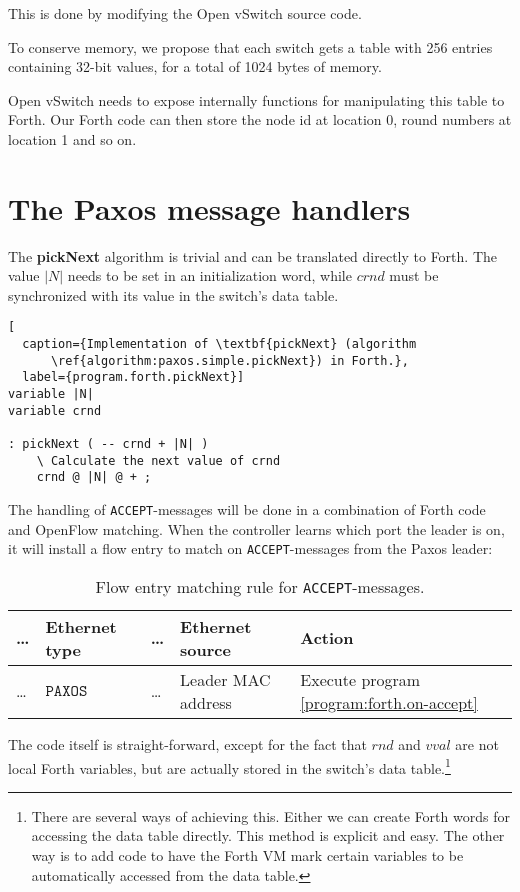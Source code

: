 This is done by modifying the Open vSwitch source code.

To conserve memory, we propose that each switch gets a table with 256
entries containing 32-bit values, for a total of 1024 bytes of memory.

Open vSwitch needs to expose internally functions for manipulating this table
to Forth.  Our Forth code can then store the node id at location 0, round
numbers at location 1 and so on.

\section{The Paxos message handlers}

The \textbf{pickNext} algorithm is trivial and can be translated directly to
Forth.  The value $|N|$ needs to be set in an initialization word,
while $crnd$ must be synchronized with its value in the switch's data table.

\begin{lstlisting}[
  caption={Implementation of \textbf{pickNext} (algorithm
      \ref{algorithm:paxos.simple.pickNext}) in Forth.},
  label={program.forth.pickNext}]
variable |N|
variable crnd

: pickNext ( -- crnd + |N| )
    \ Calculate the next value of crnd
    crnd @ |N| @ + ;
\end{lstlisting}

The handling of \texttt{ACCEPT}-messages will be done in a combination of
Forth code and OpenFlow matching.  When the controller learns which port the
leader is on, it will install a flow entry to match on
\texttt{ACCEPT}-messages from the Paxos leader:

\begin{table}[H]
  \centering
  \begin{tabular}{l|l|l|l|l|}
    \hline
      \dots &
      \textbf{Ethernet type} &
      \dots &
      \textbf{Ethernet source} &
      \textbf{Action}
      \\
    \hline
      \dots &
      $\texttt{PAXOS ACCEPT}$
      & \dots
      & Leader MAC address
      & Execute program \ref{program:forth.on-accept}
      \\
    \hline
  \end{tabular}
  \caption{Flow entry matching rule for \texttt{ACCEPT}-messages.}
  \label{table:matching.simple.accept}
\end{table}

The code itself is straight-forward, except for the fact that $rnd$ and
$vval$ are not local Forth variables, but are actually stored in the
switch's data table.\footnote{There are several ways of achieving this.
Either we can create Forth words for accessing the data table directly.
This method is explicit and easy.  The other way is to add code to have
the Forth VM mark certain variables to be automatically accessed from the
data table.}

